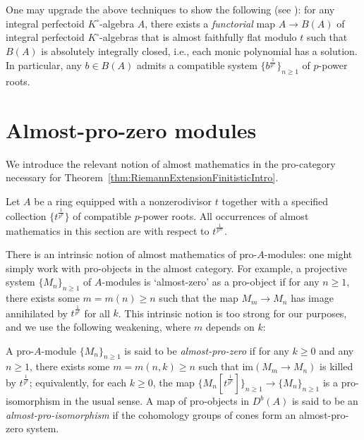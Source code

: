 \documentclass[10pt,reqno]{amsart}
\begin{document}
\begin{remark}
One may upgrade the above techniques to show the following (see \cite[Corollary 9.4.7]{BhattPerfSpaceNotes}): for any integral perfectoid $K^\circ$-algebra $A$, there exists a {\em functorial} map $A \to B(A)$ of integral perfectoid $K^\circ$-algebras that is almost faithfully flat modulo $t$ such that $B(A)$ is absolutely integrally closed, i.e., each monic polynomial has a solution. In particular, any $b \in B(A)$ admits a compatible system $\{b^{\frac{1}{p^n}}\}_{n \geq 1}$ of $p$-power roots.
\end{remark}


\section{Almost-pro-zero modules}
\label{sec:ProAlmostZero}

We introduce the relevant notion of almost mathematics in the pro-category necessary for Theorem~\ref{thm:RiemannExtensionFinitisticIntro}.

\begin{notation}
Let $A$ be a ring equipped with a nonzerodivisor $t$ together with a specified collection $\{t^{\frac{1}{p^k}}\}$ of compatible $p$-power roots. All occurrences of almost mathematics in this section are with respect to $t^{\frac{1}{p^\infty}}$.
\end{notation}

There is an intrinsic notion of almost mathematics of pro-$A$-modules: one might simply work with pro-objects in the almost category. For example, a projective system $\{M_n\}_{n \geq 1}$ of $A$-modules is `almost-zero' as a pro-object if for any $n \geq 1$, there exists some $m = m(n) \geq n$ such that the map $M_m \to M_n$ has image annihilated by $t^{\frac{1}{p^k}}$ for all $k$. This intrinsic notion is too strong for our purposes, and we use the following weakening, where $m$ depends on $k$: 


\begin{definition}
A pro-$A$-module $\{M_n\}_{n \geq 1}$ is said to be {\em almost-pro-zero} if for any $k \geq 0$ and any $n \geq 1$, there exists some $m = m(n,k) \geq n$ such that $\mathrm{im}(M_m \to M_n)$ is killed by $t^{\frac{1}{p^k}}$; equivalently, for each $k \geq 0$, the map $\{M_n[t^{\frac{1}{p^k}}]\}_{n \geq 1} \to \{M_n\}_{n \geq 1}$ is a pro-isomorphism in the usual sense. A map of pro-objects in $D^b(A)$ is said to be an {\em almost-pro-isomorphism} if the cohomology groups of cones form an almost-pro-zero system.
\end{definition}
\end{document}
